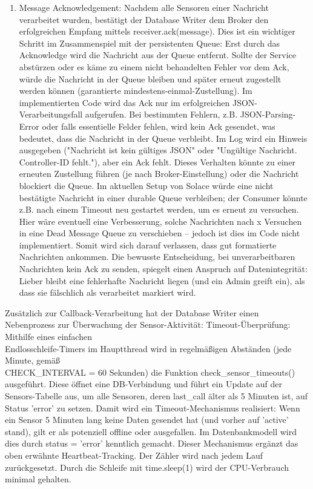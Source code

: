 \begin{enumerate}
\begin{enumerate}
        \item Message Acknowledgement: Nachdem alle Sensoren einer Nachricht verarbeitet wurden, bestätigt der Database Writer dem Broker den erfolgreichen Empfang mittels receiver.ack(message). Dies ist ein wichtiger Schritt im Zusammenspiel mit der persistenten Queue: Erst durch das Acknowledge wird die Nachricht aus der Queue entfernt. Sollte der Service abstürzen oder es käme zu einem nicht behandelten Fehler vor dem Ack, würde die Nachricht in der Queue bleiben und später erneut zugestellt werden können (garantierte mindestens-einmal-Zustellung). Im implementierten Code wird das Ack nur im erfolgreichen JSON-Verarbeitungsfall aufgerufen. Bei bestimmten Fehlern, z.B. JSON-Parsing-Error oder falls essentielle Felder fehlen, wird kein Ack gesendet, was bedeutet, dass die Nachricht in der Queue verbleibt. Im Log wird ein Hinweis ausgegeben ("Nachricht ist kein gültiges JSON" oder "Ungültige Nachricht. Controller-ID fehlt."), aber ein Ack fehlt. Dieses Verhalten könnte zu einer erneuten Zustellung führen (je nach Broker-Einstellung) oder die Nachricht blockiert die Queue. Im aktuellen Setup von Solace würde eine nicht bestätigte Nachricht in einer durable Queue verbleiben; der Consumer könnte z.B. nach einem Timeout neu gestartet werden, um es erneut zu versuchen. Hier wäre eventuell eine Verbesserung, solche Nachrichten nach x Versuchen in eine Dead Message Queue zu verschieben – jedoch ist dies im Code nicht implementiert. Somit wird sich darauf verlassen, dass gut formatierte Nachrichten ankommen. Die bewusste Entscheidung, bei unverarbeitbaren Nachrichten kein Ack zu senden, spiegelt einen Anspruch auf Datenintegrität: Lieber bleibt eine fehlerhafte Nachricht liegen (und ein Admin greift ein), als dass sie fälschlich als verarbeitet markiert wird.

    \end{enumerate}
\end{enumerate}
Zusätzlich zur Callback-Verarbeitung hat der Database Writer einen Nebenprozess zur Überwachung der Sensor-Aktivität:
Timeout-Überprüfung: Mithilfe eines einfachen \\ Endlosschleife-Timers im Hauptthread wird in regelmäßigen Abständen (jede Minute, gemäß \\ CHECK\_INTERVAL = 60 Sekunden) die Funktion check\_sensor\_timeouts() ausgeführt. Diese öffnet eine DB-Verbindung und führt ein Update auf der Sensors-Tabelle aus, um alle Sensoren, deren last\_call älter als 5 Minuten ist, auf Status 'error' zu setzen. Damit wird ein Timeout-Mechanismus realisiert: Wenn ein Sensor 5 Minuten lang keine Daten gesendet hat (und vorher auf 'active' stand), gilt er als potenziell offline oder ausgefallen. Im Datenbankmodell wird dies durch status = 'error' kenntlich gemacht. Dieser Mechanismus ergänzt das oben erwähnte Heartbeat-Tracking. Der Zähler wird nach jedem Lauf zurückgesetzt. Durch die Schleife mit time.sleep(1) wird der CPU-Verbrauch minimal gehalten.

